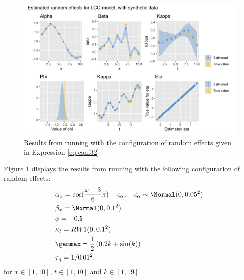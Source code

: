 \begin{figure}[h!]
    \centering
    \includegraphics[width=0.85\linewidth]{synthetic-data/Figures/effects-LCC-synthetic-3-2.png}
    \caption{Results from running \inlabru with the configuration of random effects given in Expression \ref{eq:conf32}}
    \label{fig:conf32}
\end{figure}
Figure \ref{fig:conf32} displays the results from running \inlabru with the following configuration of random effects:
\begin{equation}
    \begin{aligned}
        &\alpha_x = \cos(\frac{x-3}{6}\pi) + \epsilon_{\alpha}, \quad \epsilon_{\alpha} \sim \Normal(0,0.05^2)\\
        &\beta_x = \Normal(0,0.1^2)\\
        &\phi = -0.5\\
        &\kappa_t = RW1(0,0.1^2)\\
        &\gammax = \frac{1}{2}\left( 0.2k + \sin(k)\right)\\
        &\tau_{\eta} = 1/0.01^2.
    \end{aligned}
    \label{eq:conf32}
\end{equation}
for $x\in[1,10]$, $t \in [1,10]$ and $k \in [1,19]$. 

